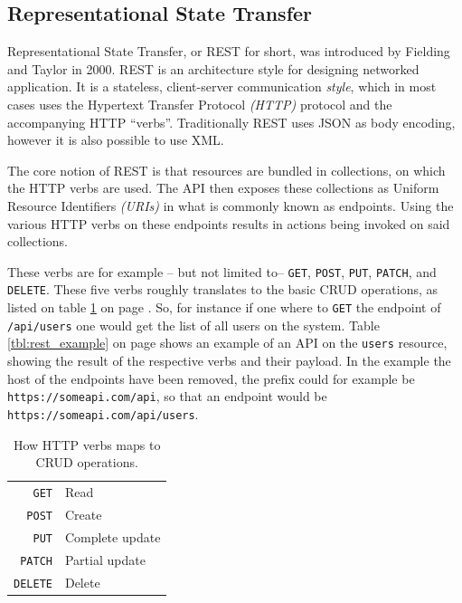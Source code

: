 		\subsection{Representational State Transfer}
			\label{sec:design:rest}
			Representational State Transfer, or REST for short, was introduced by Fielding and Taylor \cite{Fielding:2000:PDM:337180.337228} in 2000. REST is an architecture style for designing networked application. It is a stateless, client-server communication \emph{style}, which in most cases uses the Hypertext Transfer Protocol \emph{(HTTP)} protocol and the accompanying HTTP ``verbs''. Traditionally REST uses JSON as body encoding, however it is also possible to use XML.

			The core notion of REST is that resources are bundled in collections, on which the HTTP verbs are used. The API then exposes these collections as Uniform Resource Identifiers \emph{(URIs)} in what is commonly known as endpoints. Using the various HTTP verbs on these endpoints results in actions being invoked on said collections.

			These verbs are for example -- but not limited to-- \verb=GET=, \verb=POST=, \verb=PUT=, \verb=PATCH=, and \verb=DELETE=. These five verbs roughly translates to the basic CRUD operations, as listed on table \ref{tbl:verbs} on page \pageref{tbl:verbs}. So, for instance if one where to \verb=GET= the endpoint of \verb=/api/users= one would get the list of all users on the system. Table \ref{tbl:rest_example} on page \pageref{tbl:rest_example} shows an example of an API on the \verb=users= resource, showing the result of the respective verbs and their payload. In the example the host of the endpoints have been removed, the prefix could for example be \verb=https://someapi.com/api=, so that an endpoint would be \verb=https://someapi.com/api/users=.

			\begin{table}
				\begin{tabular}{r|l}
					\verb=GET= 		& Read 				\\
					\verb=POST= 	& Create 			\\
					\verb=PUT= 		& Complete update 	\\
					\verb=PATCH= 	& Partial update 	\\
					\verb=DELETE= 	& Delete 			\\
				\end{tabular}

				\caption{How HTTP verbs maps to CRUD operations.}
				\label{tbl:verbs}

			\end{table}

